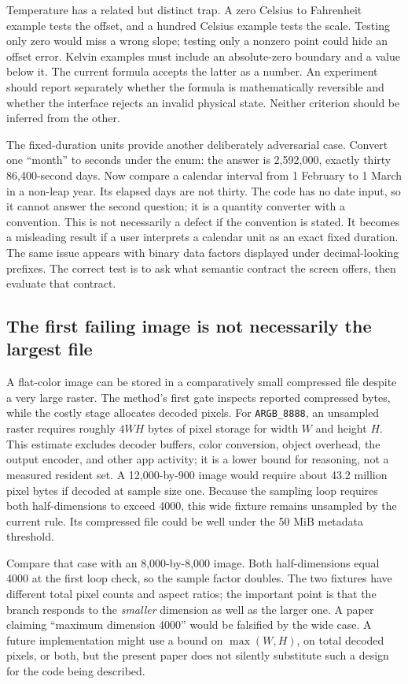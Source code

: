 \documentclass[10pt,letterpaper]{article}
\begin{document}
Temperature has a related but distinct trap. A zero Celsius to Fahrenheit example tests the offset, and a hundred Celsius example tests the scale. Testing only zero would miss a wrong slope; testing only a nonzero point could hide an offset error. Kelvin examples must include an absolute-zero boundary and a value below it. The current formula accepts the latter as a number. An experiment should report separately whether the formula is mathematically reversible and whether the interface rejects an invalid physical state. Neither criterion should be inferred from the other.

The fixed-duration units provide another deliberately adversarial case. Convert one ``month'' to seconds under the enum: the answer is 2,592,000, exactly thirty 86,400-second days. Now compare a calendar interval from 1 February to 1 March in a non-leap year. Its elapsed days are not thirty. The code has no date input, so it cannot answer the second question; it is a quantity converter with a convention. This is not necessarily a defect if the convention is stated. It becomes a misleading result if a user interprets a calendar unit as an exact fixed duration. The same issue appears with binary data factors displayed under decimal-looking prefixes. The correct test is to ask what semantic contract the screen offers, then evaluate that contract.

\subsection{The first failing image is not necessarily the largest file}

A flat-color image can be stored in a comparatively small compressed file despite a very large raster. The method's first gate inspects reported compressed bytes, while the costly stage allocates decoded pixels. For \texttt{ARGB\_8888}, an unsampled raster requires roughly $4WH$ bytes of pixel storage for width $W$ and height $H$. This estimate excludes decoder buffers, color conversion, object overhead, the output encoder, and other app activity; it is a lower bound for reasoning, not a measured resident set. A 12,000-by-900 image would require about 43.2 million pixel bytes if decoded at sample size one. Because the sampling loop requires both half-dimensions to exceed 4000, this wide fixture remains unsampled by the current rule. Its compressed file could be well under the 50 MiB metadata threshold.

Compare that case with an 8,000-by-8,000 image. Both half-dimensions equal 4000 at the first loop check, so the sample factor doubles. The two fixtures have different total pixel counts and aspect ratios; the important point is that the branch responds to the \emph{smaller} dimension as well as the larger one. A paper claiming ``maximum dimension 4000'' would be falsified by the wide case. A future implementation might use a bound on $\max(W,H)$, on total decoded pixels, or both, but the present paper does not silently substitute such a design for the code being described.
\end{document}
